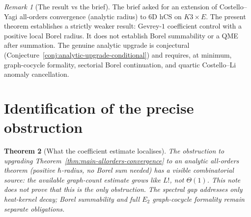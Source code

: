 \documentclass[11pt]{article}
\newtheorem{theorem}{Theorem}
\theoremstyle{definition}\newtheorem{definition}[theorem]{Definition}
\theoremstyle{remark}\newtheorem{remark}[theorem]{Remark}\newtheorem{example}[theorem]{Example}
\begin{document}
\begin{remark}[The result vs the brief]
The brief asked for an extension of Costello--Yagi all-orders
convergence (analytic radius) to $6$D hCS on $K3\times E$. The
present theorem establishes a strictly weaker result: Gevrey-$1$
coefficient control with a positive local Borel radius. It does not
establish Borel summability or a QME after summation. The genuine
analytic upgrade is conjectural
(Conjecture~\ref{conj:analytic-upgrade-conditional}) and requires, at
minimum, graph-cocycle formality, sectorial Borel continuation, and
quartic Costello--Li anomaly cancellation.
\end{remark}

\section{Identification of the precise obstruction}

\begin{theorem}[What the coefficient estimate localises]
\label{thm:obstruction-identification}
The obstruction to upgrading
Theorem~\ref{thm:main-allorders-convergence} to an analytic all-orders
theorem (positive $\hbar$-radius, no Borel sum needed) has a visible
combinatorial source: the available graph-count estimate grows like
$L!$, not $\Theta(1)$. This note does not prove that this is the only
obstruction. The spectral gap addresses only heat-kernel decay; Borel
summability and full $E_2$ graph-cocycle formality remain separate
obligations.
\end{theorem}
\end{document}
